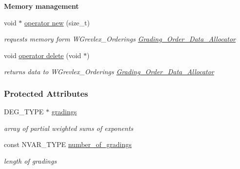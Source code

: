 \begin{Indent}\textbf{ Memory management}\par
\begin{DoxyCompactItemize}
\item 
\mbox{\label{group__orderinggroup_ac81e3130c94b4f908e277c0c9a6f3d83}} 
void $\ast$ \hyperlink{group__orderinggroup_ac81e3130c94b4f908e277c0c9a6f3d83}{operator new} (size\+\_\+t)
\begin{DoxyCompactList}\small\item\em requests memory form W\+Grevlex\+\_\+\+Ordering\textquotesingle{}s \hyperlink{group__memorygroup_class_grading___order___data___allocator}{Grading\+\_\+\+Order\+\_\+\+Data\+\_\+\+Allocator} \end{DoxyCompactList}\item 
\mbox{\label{group__orderinggroup_aa512b345dc053fe960b5d955d73270c7}} 
void \hyperlink{group__orderinggroup_aa512b345dc053fe960b5d955d73270c7}{operator delete} (void $\ast$)
\begin{DoxyCompactList}\small\item\em returns data to W\+Grevlex\+\_\+\+Ordering\textquotesingle{}s \hyperlink{group__memorygroup_class_grading___order___data___allocator}{Grading\+\_\+\+Order\+\_\+\+Data\+\_\+\+Allocator} \end{DoxyCompactList}\end{DoxyCompactItemize}
\end{Indent}
\subsubsection*{Protected Attributes}
\begin{DoxyCompactItemize}
\item 
\mbox{\label{group__orderinggroup_a84079d31936d09b373b3cb3d79c5cec4}} 
D\+E\+G\+\_\+\+T\+Y\+PE $\ast$ \hyperlink{group__orderinggroup_a84079d31936d09b373b3cb3d79c5cec4}{gradings}
\begin{DoxyCompactList}\small\item\em array of partial weighted sums of exponents \end{DoxyCompactList}\item 
\mbox{\label{group__orderinggroup_a4ec320689813725e8f1e0b23334e6cbd}} 
const N\+V\+A\+R\+\_\+\+T\+Y\+PE \hyperlink{group__orderinggroup_a4ec320689813725e8f1e0b23334e6cbd}{number\+\_\+of\+\_\+gradings}
\begin{DoxyCompactList}\small\item\em length of {\ttfamily gradings} \end{DoxyCompactList}\end{DoxyCompactItemize}


